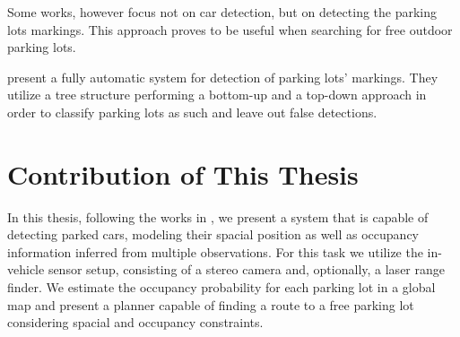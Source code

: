 Some works, however focus not on car detection, but on detecting the parking
lots markings. This approach proves to be useful when searching for free
outdoor parking lots.

\citet{suhr13} present a fully automatic system for detection of parking lots'
markings. They utilize a tree structure performing a bottom-up and a top-down
approach in order to classify parking lots as such and leave out false
detections.


\section{Contribution of This Thesis} %
\label{sec:the_contribution_of_this_thesis}

In this thesis, following the works in , we
present a system that is capable of detecting parked cars, modeling their
spacial position as well as occupancy information inferred from multiple
observations. For this task we utilize the in-vehicle sensor setup, consisting
of a stereo camera and, optionally, a laser range finder. We estimate the
occupancy probability for each parking lot in a global map and present a
planner capable of finding a route to a free parking lot considering spacial
and occupancy constraints.

